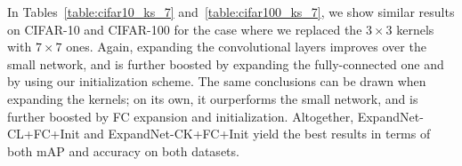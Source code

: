 \documentclass[10pt,twocolumn,letterpaper]{article}
\begin{document}
In Tables~\ref{table:cifar10_ks_7} and~\ref{table:cifar100_ks_7}, we show similar results on CIFAR-10 and CIFAR-100 for the case where we replaced the $3\times 3$ kernels with $7\times 7$ ones.
Again, expanding the convolutional layers improves over the small network, and is further boosted by expanding the fully-connected one and by using our initialization scheme. The same conclusions can be drawn when expanding the kernels; on its own, it ourperforms the small network, and is further boosted by FC expansion and initialization. Altogether, ExpandNet-CL+FC+Init  and ExpandNet-CK+FC+Init yield the best results in terms of both mAP and accuracy on both datasets.

\begin{table}[!t]
    \centering
\end{table}
\end{document}
